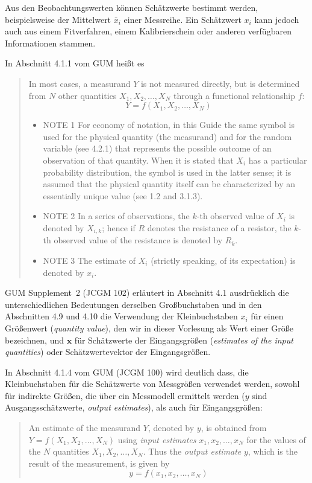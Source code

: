 Aus den Beobachtungswerten können Schätzwerte bestimmt werden, beispielsweise der Mittelwert $\bar x_i$ einer Messreihe. Ein Schätzwert $x_i$ kann jedoch auch aus einem Fitverfahren, einem Kalibrierschein oder anderen verfügbaren Informationen stammen. 

In Abschnitt 4.1.1 vom GUM heißt es
\begin{quote}
In most cases, a measurand $Y$ is not measured directly, but is determined from $N$ other quantities $X_1, X_2, \dots, X_N$ through a functional relationship $f$:
$$
Y = f(X_1,X_2,\dots,X_N)
$$
\begin{itemize}
\item[]NOTE 1 For economy of notation, in this Guide the same symbol is used for the physical quantity (the measurand) and for the random variable (see 4.2.1) that represents the possible outcome of an observation of that quantity. When it is stated that $X_i$ has a particular probability distribution, the symbol is used in the latter sense; it is assumed that the physical quantity itself can be characterized by an essentially unique value (see 1.2 and 3.1.3).
\item[]NOTE 2 In a series of observations, the $k$-th observed value of $X_i$ is denoted by $X_{i,k}$; hence if $R$ denotes the resistance
of a resistor, the $k$-th observed value of the resistance is denoted by $R_k$.
\item[]NOTE 3 The estimate of $X_i$ (strictly speaking, of its expectation) is denoted by $x_i$.
\end{itemize}
\end{quote}

GUM Supplement~2 (JCGM 102) erläutert in Abschnitt 4.1 ausdrücklich die unterschiedlichen Bedeutungen derselben Großbuchstaben und in den Abschnitten 4.9 und 4.10 die Verwendung der Kleinbuchstaben $x_i$ für einen Größenwert (\textsl{quantity value}), den wir in dieser Vorlesung als Wert einer Größe bezeichnen, und $\mathbf x$ für Schätzwerte der Eingangsgrößen (\textsl{estimates of the input quantities}) oder Schätzwertevektor der Eingangsgrößen.

In Abschnitt 4.1.4 vom GUM (JCGM 100) wird deutlich dass, die Kleinbuchstaben für die Schätzwerte von Messgrößen verwendet werden, sowohl für indirekte Größen, die über ein Messmodell ermittelt werden ($y$ sind Ausgangsschätzwerte, \textsl{output estimates}), als auch für Eingangsgrößen:

\begin{quote}
An estimate of the measurand $Y$, denoted by $y$, is obtained from $Y = f(X_1,X_2,\dots,X_N)$ using \textsl{input estimates} $x_1, x_2, \dots, x_N$ for the values of the $N$ quantities $X_1, X_2, \dots, X_N$. Thus the \textsl{output estimate} $y$, which is the result of the measurement, is given by
$$
y = f(x_1,x_2,\dots,x_N)
$$
\end{quote}

